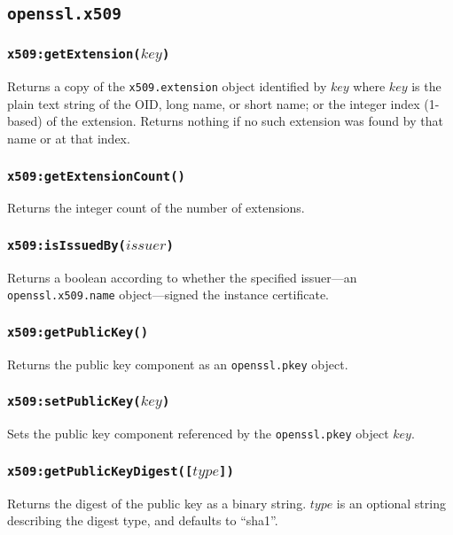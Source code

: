 \documentclass[11pt, oneside]{memoir}
\newcommand*{\fn}[1]{\texttt{#1}\xspace}
\newcommand*{\module}[1]{\texttt{#1}\xspace}
\newcounter{toccols}
\newenvironment{Module}[1]{
	\subsection{\texttt{#1}}
	\addtocontents{toc}{
		\protect\begin{multicols}{\value{toccols}}
	}
}{
	\addtocontents{toc}{\protect\end{multicols}}
}
\begin{document}
\begin{Module}{openssl.x509}
\subsubsection[\fn{x509:getExtension}]{\fn{x509:getExtension($key$)}}

Returns a copy of the \module{x509.extension} object identified by $key$ where $key$ is the plain text string of the OID, long name, or short name; or the integer index (1-based) of the extension. Returns nothing if no such extension was found by that name or at that index.

\subsubsection[\fn{x509:getExtensionCount}]{\fn{x509:getExtensionCount()}}

Returns the integer count of the number of extensions.

\subsubsection[\fn{x509:isIssuedBy}]{\fn{x509:isIssuedBy($issuer$)}}

Returns a boolean according to whether the specified issuer---an \module{openssl.x509.name} object---signed the instance certificate.

\subsubsection[\fn{x509:getPublicKey}]{\fn{x509:getPublicKey()}}

Returns the public key component as an \module{openssl.pkey} object.

\subsubsection[\fn{x509:setPublicKey}]{\fn{x509:setPublicKey($key$)}}

Sets the public key component referenced by the \module{openssl.pkey} object $key$.

\subsubsection[\fn{x509:getPublicKeyDigest}]{\fn{x509:getPublicKeyDigest([$type$])}}

Returns the digest of the public key as a binary string. $type$ is an optional string describing the digest type, and defaults to ``sha1''.


\end{Module}
\end{document}

